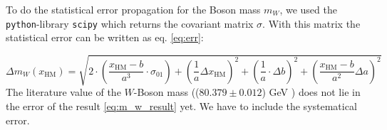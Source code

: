 \documentclass[11pt,a4paper,notitlepage]{scrartcl}
\begin{document}
\noindent To do the statistical error propagation for the Boson mass $m_W$, we used the \texttt{python}-library \texttt{scipy} which returns the covariant matrix $\sigma$. With this matrix the statistical error can be written as eq. \eqref{eq:err}:

\begin{equation}
	\Delta m_W(x_\text{HM}) = \sqrt{2\cdot\left(\frac{x_{\text{HM}}-b}{a^3}\cdot \sigma_{01}\right)+\left(\frac{1}{a}\Delta x_{\text{HM}}\right)^2+\left(\frac{1}{a}\cdot \Delta b\right)^2+\left(\frac{x_\text{HM}-b}{a^2}\Delta a\right)^2}
\end{equation}
The literature value of the $W$-Boson mass (($80.379 \pm 0.012$) GeV \cite{pdg}) does not lie in the error of the result \ref{eq:m_w_result} yet. We have to include the systematical error.
\end{document}
